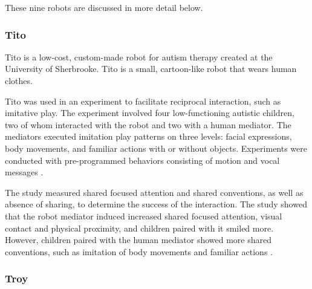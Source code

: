 \begin{longtable}
      \hline
      
      
      \caption{Nine robots used in interventions targeting improvement of communication skills for children with ASDs. Pilot studies examining the robot's usability for this purpose, and studies where the robot was interacting with children with ASD are included. Robots are organized by category: robots that were designed specifically for use by children with autism first, robots that were designed for research and adapted for use by children with autism next, and robots that were designed for commercial use but adapted for research for children with autism last. Inside these categories, robots are organized according to oldest relevant research.}
      \label{table:robots}
    
  \end{longtable}


These nine robots are discussed in more detail below.


\subsubsection{Tito}

Tito is a low-cost, custom-made robot for autism therapy created at the University of Sherbrooke. Tito is a small, cartoon-like robot that wears human clothes. 

Tito was used in an experiment to facilitate reciprocal interaction, such as imitative play. The experiment involved four low-functioning autistic children, two of whom interacted with the robot and two with a human mediator. The mediators executed imitation play patterns on three levels: facial expressions, body movements, and familiar actions with or without objects. Experiments were conducted with pre-programmed behaviors consisting of motion and vocal messages \cite{duquette2008exploring}.

The study measured shared focused attention and shared conventions, as well as absence of sharing, to determine the success of the interaction. The study showed that the robot mediator induced increased shared focused attention, visual contact and physical proximity, and children paired with it smiled more. However, children paired with the human mediator showed more shared conventions, such as imitation of body movements and familiar actions \cite{duquette2008exploring}.


\subsubsection{Troy}

